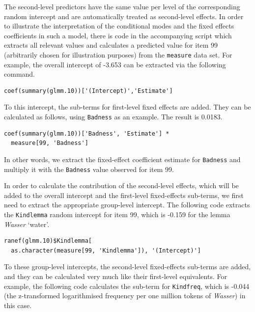 The second-level predictors have the same value per level of the corresponding random intercept and are automatically treated as second-level effects.
In order to illustrate the interpretation of the conditional modes and the fixed effects coefficients in such a model, there is code in the accompanying script which extracts all relevant values and calculates a predicted value for item 99 (arbitrarily chosen for illustration purposes) from the \texttt{measure} data set.
For example, the overall intercept of -3.653 can be extracted via the following command.

\vspace{0.5\baselineskip}

\begin{lstlisting}
coef(summary(glmm.10))['(Intercept)','Estimate']
\end{lstlisting}

To this intercept, the sub-terms for first-level fixed effects are added.
They can be calculated as follows, using \texttt{Badness} as an example.
The result is 0.0183.

\vspace{0.5\baselineskip}

\begin{lstlisting}
coef(summary(glmm.10))['Badness', 'Estimate'] *
  measure[99, 'Badness']
\end{lstlisting}

In other words, we extract the fixed-effect coefficient estimate for \texttt{Badness} and multiply it with the \texttt{Badness} value observed for item 99.

In order to calculate the contribution of the second-level effects, which will be added to the overall intercept and the first-level fixed-effects sub-terms, we first need to extract the appropriate group-level intercept.
The following code extracts the \texttt{Kindlemma} random intercept for item 99, which is -0.159 for the lemma \textit{Wasser} `water'.

\vspace{0.5\baselineskip}

\begin{lstlisting}
ranef(glmm.10)$Kindlemma[
  as.character(measure[99, 'Kindlemma']), '(Intercept)']
\end{lstlisting}

To these group-level intercepts, the second-level fixed-effects sub-terms are added, and they can be calculated very much like their first-level equivalents.
For example, the following code calculates the sub-term for \texttt{Kindfreq}, which is -0.044 (the z-transformed logarithmised frequency per one million tokens of \textit{Wasser}) in this case.

